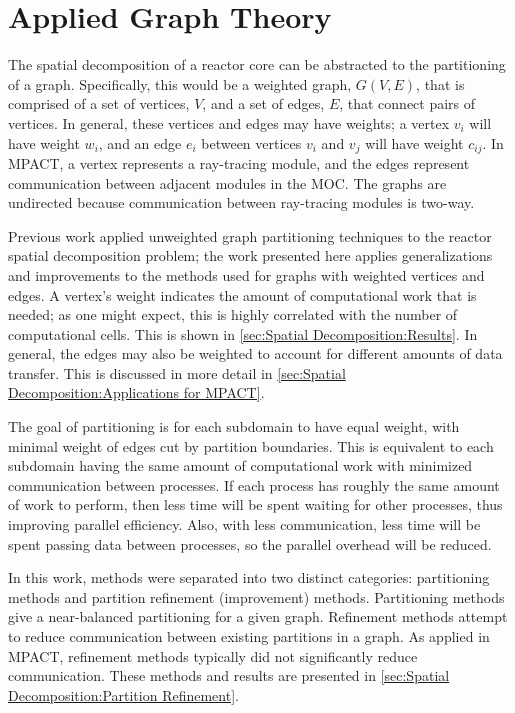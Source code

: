 {  \section{Applied Graph Theory}{\label{sec:Spatial Decomposition:Applied Graph Theory}
    The spatial decomposition of a reactor core can be abstracted to the partitioning of a graph.
    Specifically, this would be a weighted graph, $G(V,E)$, that is comprised of a set of vertices, $V$, and a set of edges, $E$, that connect pairs of vertices.
    In general, these vertices and edges may have weights; a vertex $v_i$ will have weight $w_i$, and an edge $e_i$ between vertices $v_i$ and $v_j$ will have weight $c_{ij}$.
    In MPACT, a vertex represents a ray-tracing module, and the edges represent communication between adjacent modules in the \ac{MOC}.
    The graphs are undirected because communication between ray-tracing modules is two-way.

    Previous work \cite{Fitzgerald2017} applied unweighted graph partitioning techniques to the reactor spatial decomposition problem; the work presented here applies generalizations and improvements to the methods used for graphs with weighted vertices and edges.
    A vertex's weight indicates the amount of computational work that is needed; as one might expect, this is highly correlated with the number of computational cells.
    This is shown in \cref{sec:Spatial Decomposition:Results}.
    In general, the edges may also be weighted to account for different amounts of data transfer.
    This is discussed in more detail in \cref{sec:Spatial Decomposition:Applications for MPACT}.

    The goal of partitioning is for each subdomain to have equal weight, with minimal weight of edges cut by partition boundaries.
    This is equivalent to each subdomain having the same amount of computational work with minimized communication between processes.
    If each process has roughly the same amount of work to perform, then less time will be spent waiting for other processes, thus improving parallel efficiency.
    Also, with less communication, less time will be spent passing data between processes, so the parallel overhead will be reduced.

    In this work, methods were separated into two distinct categories: partitioning methods and partition refinement (improvement) methods.
    Partitioning methods give a near-balanced partitioning for a given graph.
    Refinement methods attempt to reduce communication between existing partitions in a graph.
    As applied in MPACT, refinement methods typically did not significantly reduce communication.
    These methods and results are presented in \cref{sec:Spatial Decomposition:Partition Refinement}.
}}
